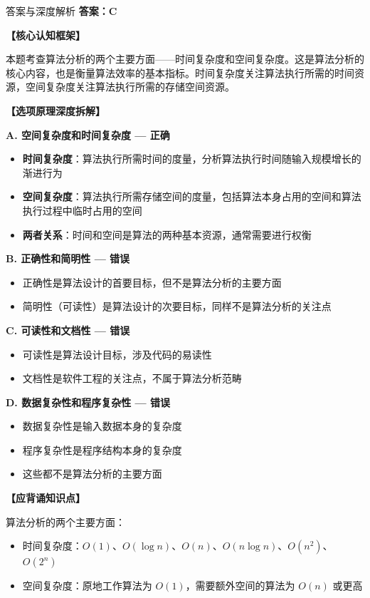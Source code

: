 \documentclass[12pt, a4paper]{article}
\newenvironment{bluebox}{\begin{framed}\begin{minipage}{\textwidth}}{\end{minipage}\end{framed}}
\begin{document}
\begin{bluebox}{答案与深度解析}
	\textbf{答案：C}

	\textbf{【核心认知框架】}

	本题考查算法分析的两个主要方面——时间复杂度和空间复杂度。这是算法分析的核心内容，也是衡量算法效率的基本指标。时间复杂度关注算法执行所需的时间资源，空间复杂度关注算法执行所需的存储空间资源。

	\textbf{【选项原理深度拆解】}

	\item \textbf{A. 空间复杂度和时间复杂度 — 正确}
	\begin{itemize}
		\item \textbf{时间复杂度}：算法执行所需时间的度量，分析算法执行时间随输入规模增长的渐进行为
		\item \textbf{空间复杂度}：算法执行所需存储空间的度量，包括算法本身占用的空间和算法执行过程中临时占用的空间
		\item \textbf{两者关系}：时间和空间是算法的两种基本资源，通常需要进行权衡
	\end{itemize}

	\item \textbf{B. 正确性和简明性 — 错误}
	\begin{itemize}
		\item 正确性是算法设计的首要目标，但不是算法分析的主要方面
		\item 简明性（可读性）是算法设计的次要目标，同样不是算法分析的关注点
	\end{itemize}

	\item \textbf{C. 可读性和文档性 — 错误}
	\begin{itemize}
		\item 可读性是算法设计目标，涉及代码的易读性
		\item 文档性是软件工程的关注点，不属于算法分析范畴
	\end{itemize}

	\item \textbf{D. 数据复杂性和程序复杂性 — 错误}
	\begin{itemize}
		\item 数据复杂性是输入数据本身的复杂度
		\item 程序复杂性是程序结构本身的复杂度
		\item 这些都不是算法分析的主要方面
	\end{itemize}

	\textbf{【应背诵知识点】}

	算法分析的两个主要方面：
	\begin{itemize}
		\item 时间复杂度：$O(1)$、$O(\log n)$、$O(n)$、$O(n \log n)$、$O(n^2)$、$O(2^n)$
		\item 空间复杂度：原地工作算法为 $O(1)$，需要额外空间的算法为 $O(n)$ 或更高
	\end{itemize}
\end{bluebox}
\end{document}
